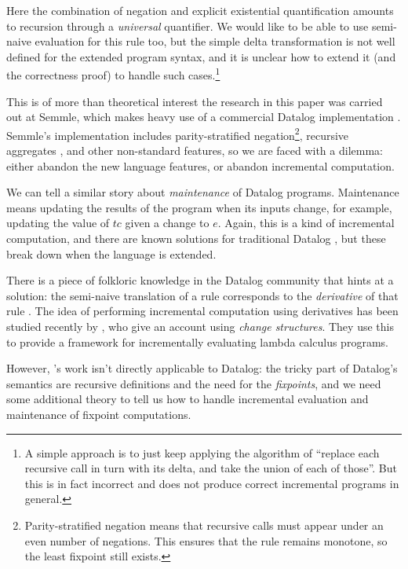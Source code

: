 Here the combination of negation and explicit existential quantification amounts
to recursion through a \emph{universal} quantifier. We would
like to be able to use semi-naive evaluation for this rule too, but the simple delta
transformation is not well defined for the extended program syntax, and it is unclear how to extend it (and the
correctness proof) to handle such cases.\footnote{A simple approach is to just
  keep applying the algorithm of ``replace each recursive call in turn with its
  delta, and take the union of each of those''. But this is in fact incorrect
  and does not produce correct incremental programs in general.}

This is of more than theoretical interest \textemdash{} the research
in this paper was carried out at Semmle, which
makes heavy use of a commercial Datalog implementation
\autocites{semmleWebsite}{avgustinov2016ql}{sereni2008adding}{schafer2010type}.
Semmle's implementation includes parity-stratified negation\footnote{Parity-stratified negation means that recursive calls must
  appear under an even number of negations. This ensures that the rule remains
  monotone, so the least fixpoint still exists.},
recursive aggregates \autocite{demoor2013aggregates}, and other non-standard
features, so we are faced with a dilemma: either abandon the new language
features, or abandon incremental computation.

We can tell a similar story about \emph{maintenance} of Datalog programs.
Maintenance means updating the results of the program when its inputs change,
for example, updating the value of $tc$ given a change to $e$. Again, this is a
kind of incremental computation, and there are known solutions for traditional Datalog
\autocite{gupta1993maintaining}, but these break down when the language is extended.

There is a piece of folkloric knowledge in the Datalog community that hints at a
solution: the semi-naive translation of a rule corresponds to the
\emph{derivative} of that rule \autocites{bancilhon1986naive}[section
3.2.2]{bancilhon1986amateur}. The idea of performing incremental computation using derivatives has been
studied recently by \textcite{cai2014changes}, who give an account using
\emph{change structures}. They use this to provide a framework for incrementally evaluating lambda calculus programs.

However, \citeauthor{cai2014changes}'s work isn't directly applicable to Datalog: the tricky part
of Datalog's semantics are recursive definitions and the need for the \emph{fixpoints}, and we need some additional theory to tell us how to
handle incremental evaluation and maintenance of fixpoint computations.

